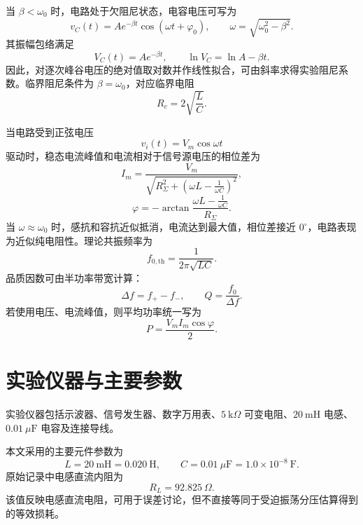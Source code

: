 ﻿\documentclass[UTF8,12pt,a4paper]{ctexart}
\numberwithin{equation}{section}
\begin{document}
当 \(\beta<\omega_0\) 时，电路处于欠阻尼状态，电容电压可写为
\begin{equation}
    v_C(t)=A e^{-\beta t}\cos(\omega t+\varphi_0),
    \qquad
    \omega=\sqrt{\omega_0^2-\beta^2}.
\end{equation}
其振幅包络满足
\begin{equation}
    V_C(t)=A e^{-\beta t},\qquad
    \ln V_C=\ln A-\beta t.
\end{equation}
因此，对逐次峰谷电压的绝对值取对数并作线性拟合，可由斜率求得实验阻尼系数。临界阻尼条件为 \(\beta=\omega_0\)，对应临界电阻
\begin{equation}
    R_c=2\sqrt{\frac{L}{C}}.
\end{equation}

当电路受到正弦电压
\[
    v_i(t)=V_m\cos\omega t
\]
驱动时，稳态电流峰值和电流相对于信号源电压的相位差为
\begin{equation}
    I_m=\frac{V_m}{\sqrt{R_\Sigma^2+\left(\omega L-\frac{1}{\omega C}\right)^2}},
\end{equation}
\begin{equation}
    \varphi=-\arctan\frac{\omega L-\frac{1}{\omega C}}{R_\Sigma}.
\end{equation}
当 \(\omega\approx\omega_0\) 时，感抗和容抗近似抵消，电流达到最大值，相位差接近 \(0^\circ\)，电路表现为近似纯电阻性。理论共振频率为
\begin{equation}
    f_{0,\mathrm{th}}=\frac{1}{2\pi\sqrt{LC}}.
\end{equation}
品质因数可由半功率带宽计算：
\begin{equation}
    \Delta f=f_+-f_-,
    \qquad
    Q=\frac{f_0}{\Delta f}.
\end{equation}
若使用电压、电流峰值，则平均功率统一写为
\begin{equation}
    P=\frac{V_m I_m\cos\varphi}{2}.
\end{equation}

\section{实验仪器与主要参数}

实验仪器包括示波器、信号发生器、数字万用表、\(5\ \mathrm{k}\Omega\) 可变电阻、\(20\ \mathrm{mH}\) 电感、\(0.01\ \mu\mathrm{F}\) 电容及连接导线。

本文采用的主要元件参数为
\begin{equation}
    L=20\ \mathrm{mH}=0.020\ \mathrm{H},\qquad
    C=0.01\ \mu\mathrm{F}=1.0\times10^{-8}\ \mathrm{F}.
\end{equation}
原始记录中电感直流内阻为
\begin{equation}
    R_L=92.825\ \Omega.
\end{equation}
该值反映电感直流电阻，可用于误差讨论，但不直接等同于受迫振荡分压估算得到的等效损耗。
\end{document}
